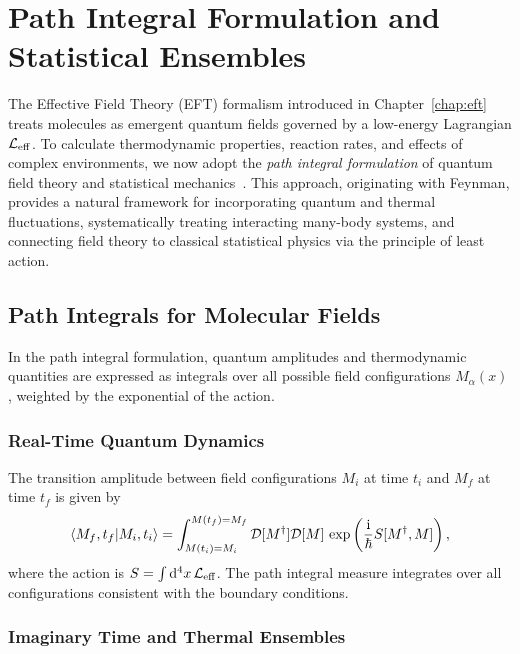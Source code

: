 
\chapter{Path Integral Formulation and Statistical Ensembles}
\label{chap:path_integral}

The Effective Field Theory (EFT) formalism introduced in Chapter~\ref{chap:eft} treats molecules as emergent quantum fields governed by a low-energy Lagrangian \(\mathcal{L}_{\mathrm{eff}}\). To calculate thermodynamic properties, reaction rates, and effects of complex environments, we now adopt the \emph{path integral formulation} of quantum field theory and statistical mechanics~\cite{Feynman1965, Kleinert2009}. This approach, originating with Feynman, provides a natural framework for incorporating quantum and thermal fluctuations, systematically treating interacting many-body systems, and connecting field theory to classical statistical physics via the principle of least action.

\section{Path Integrals for Molecular Fields}
\label{sec:path_integral_intro}

In the path integral formulation, quantum amplitudes and thermodynamic quantities are expressed as integrals over all possible field configurations \(M_\alpha(x)\), weighted by the exponential of the action.

\subsection{Real-Time Quantum Dynamics}

The transition amplitude between field configurations \(M_i\) at time \(t_i\) and \(M_f\) at time \(t_f\) is given by
\begin{equation}
	\braket{M_f, t_f}{M_i, t_i} = \int_{M(t_i)=M_i}^{M(t_f)=M_f} \mathcal{D}[M^\dagger] \mathcal{D}[M] \, \exp\left(\frac{\mathrm{i}}{\hbar} S[M^\dagger, M]\right),
	\label{eq:path_integral_real_time}
\end{equation}
where the action is \(S = \int \mathrm{d}^4x \, \mathcal{L}_{\mathrm{eff}}\). The path integral measure integrates over all configurations consistent with the boundary conditions.

\subsection{Imaginary Time and Thermal Ensembles}

